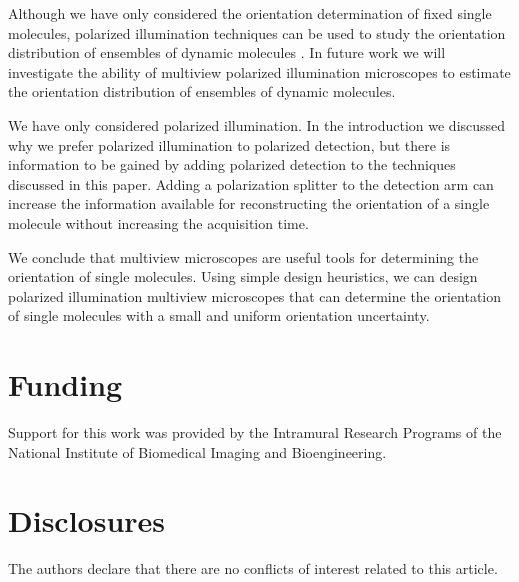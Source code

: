 \documentclass[10pt]{article}
\begin{document}
Although we have only considered the orientation determination of fixed single
molecules, polarized illumination techniques can be used to study the
orientation distribution of ensembles of dynamic molecules \cite{mehta2016,
  backer2016}. In future work we will investigate the ability of multiview
polarized illumination microscopes to estimate the orientation distribution of
ensembles of dynamic molecules.

We have only considered polarized illumination. In the introduction
we discussed why we prefer polarized illumination to polarized detection, but
there is information to be gained by adding polarized detection to the
techniques discussed in this paper. Adding a polarization splitter to the
detection arm can increase the information available for reconstructing the
orientation of a single molecule without increasing the acquisition time.

We conclude that multiview microscopes are useful tools for determining the
orientation of single molecules. Using simple design heuristics, we can design
polarized illumination multiview microscopes that can determine the orientation
of single molecules with a small and uniform orientation uncertainty.

\section*{Funding}
Support for this work was provided by the Intramural Research Programs of the
National Institute of Biomedical Imaging and Bioengineering.

\section*{Disclosures}
The authors declare that there are no conflicts of interest related to this article.
\end{document}

